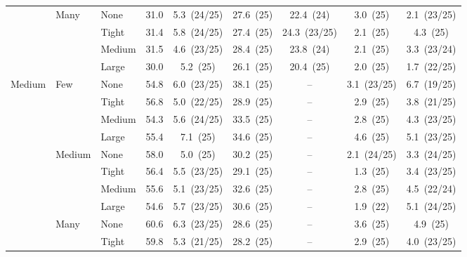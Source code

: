 \begin{table}[htbp]
{\begin{tabular}{lll c ccccc}
 & \multirow{4}{*}{\small Many} & {\small None} & 31.0 & 5.3~{\scriptsize(24/25)} & 27.6~{\scriptsize(25)} & 22.4~{\scriptsize(24)} & 3.0~{\scriptsize(25)} & 2.1~{\scriptsize(23/25)} \\
 &  & {\small Tight} & 31.4 & 5.8~{\scriptsize(24/25)} & 27.4~{\scriptsize(25)} & 24.3~{\scriptsize(23/25)} & 2.1~{\scriptsize(25)} & 4.3~{\scriptsize(25)} \\
 &  & {\small Medium} & 31.5 & 4.6~{\scriptsize(23/25)} & 28.4~{\scriptsize(25)} & 23.8~{\scriptsize(24)} & 2.1~{\scriptsize(25)} & 3.3~{\scriptsize(23/24)} \\
 &  & {\small Large} & 30.0 & 5.2~{\scriptsize(25)} & 26.1~{\scriptsize(25)} & 20.4~{\scriptsize(25)} & 2.0~{\scriptsize(25)} & 1.7~{\scriptsize(22/25)} \\
\midrule
\multirow{12}{*}{\small Medium} & \multirow{4}{*}{\small Few} & {\small None} & 54.8 & 6.0~{\scriptsize(23/25)} & 38.1~{\scriptsize(25)} & -- & 3.1~{\scriptsize(23/25)} & 6.7~{\scriptsize(19/25)} \\
 &  & {\small Tight} & 56.8 & 5.0~{\scriptsize(22/25)} & 28.9~{\scriptsize(25)} & -- & 2.9~{\scriptsize(25)} & 3.8~{\scriptsize(21/25)} \\
 &  & {\small Medium} & 54.3 & 5.6~{\scriptsize(24/25)} & 33.5~{\scriptsize(25)} & -- & 2.8~{\scriptsize(25)} & 4.3~{\scriptsize(23/25)} \\
 &  & {\small Large} & 55.4 & 7.1~{\scriptsize(25)} & 34.6~{\scriptsize(25)} & -- & 4.6~{\scriptsize(25)} & 5.1~{\scriptsize(23/25)} \\
 & \multirow{4}{*}{\small Medium} & {\small None} & 58.0 & 5.0~{\scriptsize(25)} & 30.2~{\scriptsize(25)} & -- & 2.1~{\scriptsize(24/25)} & 3.3~{\scriptsize(24/25)} \\
 &  & {\small Tight} & 56.4 & 5.5~{\scriptsize(23/25)} & 29.1~{\scriptsize(25)} & -- & 1.3~{\scriptsize(25)} & 3.4~{\scriptsize(23/25)} \\
 &  & {\small Medium} & 55.6 & 5.1~{\scriptsize(23/25)} & 32.6~{\scriptsize(25)} & -- & 2.8~{\scriptsize(25)} & 4.5~{\scriptsize(22/24)} \\
 &  & {\small Large} & 54.6 & 5.7~{\scriptsize(23/25)} & 30.6~{\scriptsize(25)} & -- & 1.9~{\scriptsize(22)} & 5.1~{\scriptsize(24/25)} \\
 & \multirow{4}{*}{\small Many} & {\small None} & 60.6 & 6.3~{\scriptsize(23/25)} & 28.6~{\scriptsize(25)} & -- & 3.6~{\scriptsize(25)} & 4.9~{\scriptsize(25)} \\
 &  & {\small Tight} & 59.8 & 5.3~{\scriptsize(21/25)} & 28.2~{\scriptsize(25)} & -- & 2.9~{\scriptsize(25)} & 4.0~{\scriptsize(23/25)} \\

\end{tabular}}
\end{table}
